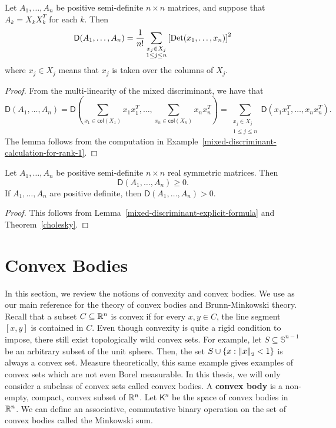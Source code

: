 \documentclass{puthesis-UG}
\begin{document}
\begin{lem}  \label{mixed-discriminant-explicit-formula}
	Let $A_1, \ldots, A_n$ be positive semi-definite $n \times n$ matrices, and suppose that $A_k = X_k X_k^T$ for each $k$. Then
	\[
		\mathsf{D} (A_1, \ldots, A_n) = \frac{1}{n!} \sum_{\substack{x_j \in X_j \\ 1 \leq j \leq n}} \left [ \operatorname{Det}(x_1, \ldots, x_n) \right ]^2
	\]
	where $x_j \in X_j$ means that $x_j$ is taken over the columns of $X_j$.
\end{lem}

\begin{proof}
	From the multi-linearity of the mixed discriminant, we have that 
	\[
		\mathsf{D}(A_1, \ldots, A_n) = \mathsf{D} \left ( \sum_{x_1 \in \mathsf{col}(X_1)} x_1x_1^T, \ldots, \sum_{x_n \in \mathsf{col}(X_n)} x_nx_n^T \right ) = \sum_{\substack{x_j \in X_j \\ 1 \leq j \leq n}} \mathsf{D} (x_1x_1^T, \ldots, x_nx_n^T).
	\]
	The lemma follows from the computation in Example~\ref{mixed-discriminant-calculation-for-rank-1}. 
\end{proof}

\begin{cor} \label{final-positivity-corollary}
	Let $A_1, \ldots, A_n$ be positive semi-definite $n \times n$ real symmetric matrices. Then 
	\[
		\mathsf{D}(A_1, \ldots, A_n) \geq 0.
	\]	
	If $A_1, \ldots, A_n$ are positive definite, then $\mathsf{D}(A_1, \ldots, A_n) > 0$. 
\end{cor}

\begin{proof}
	This follows from Lemma~\ref{mixed-discriminant-explicit-formula} and Theorem~\ref{cholesky}. 
\end{proof}

\section{Convex Bodies} \label{sec:convex-bodies}

In this section, we review the notions of convexity and convex bodies. We use \cite{schneider_2013} as our main reference for the theory of convex bodies and Brunn-Minkowski theory. Recall that a subset $C \subseteq \mathbb{R}^n$ is convex if for every $x, y \in C$, the line segment $[x, y]$ is contained in $C$. Even though convexity is quite a rigid condition to impose, there still exist topologically wild convex sets. For example, let $S \subseteq \mathbb{S}^{n-1}$ be an arbitrary subset of the unit sphere. Then, the set $S \cup \{x : \left\lVert x\right\rVert_2 < 1\}$ is always a convex set. Measure theoretically, this same example gives examples of convex sets which are not even Borel measurable. In this thesis, we will only consider a subclass of convex sets called convex bodies. A \textbf{convex body} is a non-empty, compact, convex subset of $\mathbb{R}^n$. Let $\mathsf{K}^n$ be the space of convex bodies in $\mathbb{R}^n$. We can define an associative, commutative binary operation on the set of convex bodies called the Minkowski sum. 
\end{document}
